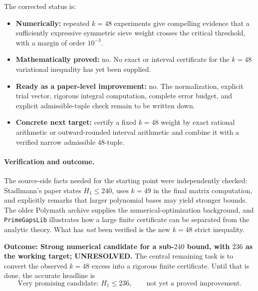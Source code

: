 \documentclass[11pt]{article}
\begin{document}
The corrected status is:
\begin{itemize}
\item \textbf{Numerically:} repeated $k=48$ experiments give compelling evidence that a sufficiently expressive symmetric sieve weight crosses the critical threshold, with a margin of order $10^{-3}$.
\item \textbf{Mathematically proved:} no.  No exact or interval certificate for the $k=48$ variational inequality has yet been supplied.
\item \textbf{Ready as a paper-level improvement:} no.  The normalization, explicit trial vector, rigorous integral computation, complete error budget, and explicit admissible-tuple check remain to be written down.
\item \textbf{Concrete next target:} certify a fixed $k=48$ weight by exact rational arithmetic or outward-rounded interval arithmetic and combine it with a verified narrow admissible $48$-tuple.
\end{itemize}

\paragraph{Verification and outcome.}
The source-side facts needed for the starting point were independently checked: Stadlmann's paper states $H_1\le240$, uses $k=49$ in the final matrix computation, and explicitly remarks that larger polynomial bases may yield stronger bounds.  The older Polymath archive supplies the numerical-optimization background, and \texttt{PrimeGapsLib} illustrates how a large finite certificate can be separated from the analytic theory.  What has \emph{not} been verified is the new $k=48$ strict inequality.

\textbf{Outcome: Strong numerical candidate for a sub-$240$ bound, with $236$ as the working target; UNRESOLVED.}  The central remaining task is to convert the observed $k=48$ excess into a rigorous finite certificate.  Until that is done, the accurate headline is
\[
 \boxed{\text{Very promising candidate: }H_1\le236,\qquad\text{not yet a proved improvement.}}
\]
\end{document}
